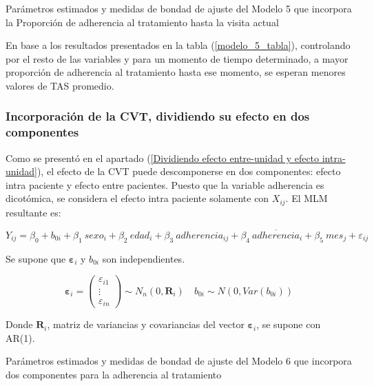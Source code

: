 \documentclass[spanish]{article}
\numberwithin{figure}{subsection}
\numberwithin{equation}{subsection}
\numberwithin{table}{subsection}
\begin{document}
\begin{table}[H]
	\centering
	\caption{Parámetros estimados y medidas de bondad de ajuste del Modelo 5 que incorpora la Proporción de adherencia al tratamiento hasta la visita actual}
	\label{modelo_5_tabla}
	
\end{table}

En base a los resultados presentados en la tabla (\ref{modelo_5_tabla}),
controlando por el resto de las variables y para un momento de tiempo
determinado, a mayor proporción de adherencia al tratamiento hasta ese momento,
se esperan menores valores de TAS promedio.

\subsubsection{Incorporación de la CVT, dividiendo su efecto en dos componentes}

Como se presentó en el apartado (\ref{Dividiendo efecto entre-unidad y efecto
intra-unidad}), el efecto de la CVT puede descomponerse en dos componentes:
efecto intra paciente y efecto entre pacientes. Puesto que la variable
adherencia es dicotómica, se considera el efecto intra paciente solamente con
$X_{ij}$. El MLM resultante es:

\begin{equation}
	\label{modelo_6}
	Y_{ij} = \beta_0 + b_{0i} + \beta_1\ sexo_i + \beta_2\ edad_i + \beta_3\ adherencia_{ij}
	+ \beta_4\ \overline{adherencia}_i + \beta_5\ mes_j + \varepsilon_{ij}
\end{equation}

Se supone que $\bm{\varepsilon}_i$ y $b_{0i}$ son independientes.

\[ 
	\bm{\varepsilon}_i = \begin{pmatrix} \varepsilon_{i1} \\ \vdots \\ \varepsilon_{in} \end{pmatrix} \sim N_{n}(0, \bm{R}_i)
	\quad
	b_{0i} \sim N(0, Var(b_{0i}))
\]

Donde $\bm{R}_i$, matriz de variancias y covariancias del vector
$\bm{\varepsilon}_{i}$, se supone con AR(1).

\begin{table}[H]
	\centering
	\caption{Parámetros estimados y medidas de bondad de ajuste del Modelo 6 que incorpora dos componentes para la adherencia al tratamiento}
	\label{modelo_6_tabla}
	
\end{table}
\end{document}
